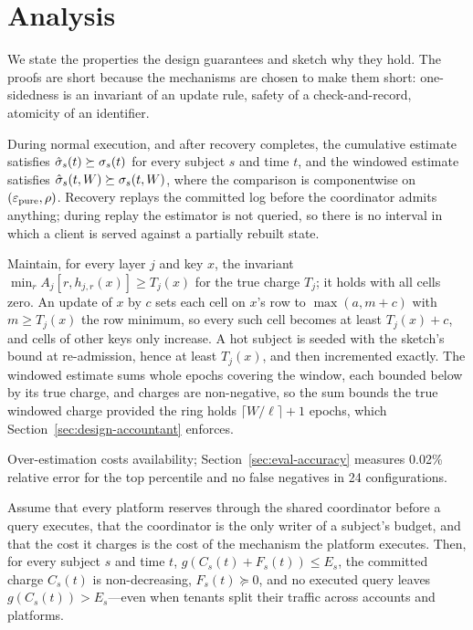 \section{Analysis}
\label{sec:analysis}

We state the properties the design guarantees and sketch why they hold. The proofs
are short because the mechanisms are chosen to make them short: one-sidedness is an
invariant of an update rule, safety of a check-and-record, atomicity of an
identifier.

\begin{proposition}
\label{prop:onesided}
During normal execution, and after recovery completes, the cumulative estimate
satisfies $\hat{\sigma}_s(t)\succeq\sigma_s(t)$ for every subject $s$ and time $t$,
and the windowed estimate satisfies
$\hat{\sigma}_s(t,W)\succeq\sigma_s(t,W)$, where the comparison is componentwise on
$(\varepsilon_{\mathrm{pure}},\rho)$. Recovery replays the committed log before the
coordinator admits anything; during replay the estimator is not queried, so there is
no interval in which a client is served against a partially rebuilt state.
\end{proposition}

\begin{IEEEproof}
Maintain, for every layer $j$ and key $x$, the invariant
$\min_r A_j[r,h_{j,r}(x)]\ge T_j(x)$ for the true charge $T_j$; it holds with all
cells zero. An update of $x$ by $c$ sets each cell on $x$'s row to $\max(a,m+c)$ with
$m\ge T_j(x)$ the row minimum, so every such cell becomes at least $T_j(x)+c$, and
cells of other keys only increase. A hot subject is seeded with the sketch's bound at
re-admission, hence at least $T_j(x)$, and then incremented exactly. The windowed
estimate sums whole epochs covering the window, each bounded below by its true charge,
and charges are non-negative, so the sum bounds the true windowed charge provided the
ring holds $\lceil W/\ell\rceil+1$ epochs, which
Section~\ref{sec:design-accountant} enforces.
\end{IEEEproof}

Over-estimation costs availability; Section~\ref{sec:eval-accuracy} measures 0.02\%
relative error for the top percentile and no false negatives in 24 configurations.

\begin{proposition}
\label{prop:safety}
Assume that every platform reserves through the shared coordinator before a query
executes, that the coordinator is the only writer of a subject's budget, and that
the cost it charges is the cost of the mechanism the platform executes. Then, for
every subject $s$ and time $t$, $g(C_s(t)+F_s(t))\le E_s$, the committed charge
$C_s(t)$ is non-decreasing, $F_s(t)\succeq0$, and no executed query leaves
$g(C_s(t))>E_s$---even when tenants split their traffic across accounts and
platforms.
\end{proposition}

